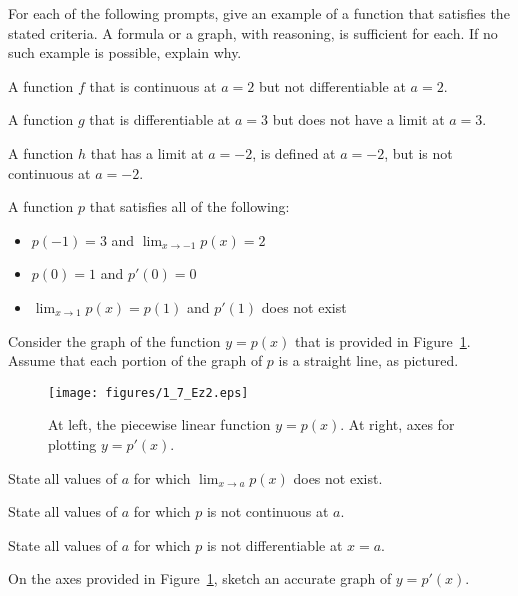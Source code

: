 \begin{exercises} 
\item For each of the following prompts, give an example of a function that satisfies the stated criteria.  A formula or a graph, with reasoning, is sufficient for each.  If no such example is possible, explain why.
	\ba
	  \item A function $f$ that is continuous at $a = 2$ but not differentiable at $a = 2$.
	  \item A function $g$ that is differentiable at $a = 3$ but does not have a limit at $a=3$.
	  \item A function $h$ that has a limit at $a = -2$, is defined at $a = -2$, but is not continuous at $a = -2$.
	  \item A function $p$ that satisfies all of the following:
	  \begin{itemize}
	  	\item $p(-1) = 3$ and $\lim_{x \to -1} p(x) = 2$
		\item $p(0) = 1$ and $p'(0) = 0$
		\item $\lim_{x \to 1} p(x) = p(1)$ and $p'(1)$ does not exist
	  \end{itemize}
	\ea

\item Consider the graph of the function $y = p(x)$ that is provided in Figure~\ref{F:1.7.Ez2}.  Assume that each portion of the graph of $p$ is a straight line, as pictured.
\begin{figure}[h]
\begin{center}
\texttt{[image: figures/1\_7\_Ez2.eps]}
\caption{At left, the piecewise linear function $y = p(x)$.  At right, axes for plotting $y = p'(x)$.} \label{F:1.7.Ez2}
\end{center}
\end{figure}
	\ba
		\item State all values of $a$ for which $\lim_{x \to a} p(x)$ does not exist.
		\item State all values of $a$ for which $p$ is not continuous at $a$.
		\item State all values of $a$ for which $p$ is not differentiable at $x = a$.
		\item On the axes provided in Figure~\ref{F:1.7.Ez2}, sketch an accurate graph of $y = p'(x)$.
	\ea


\end{exercises}
